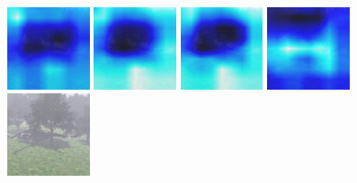 \begin{figure}[H]
  {\includegraphics[height=2.4cm, width=2.4cm]{images/vbs3/gradcam/5-5/2/Heat_map_of_iterations_0.png}}
  {\includegraphics[height=2.4cm, width=2.4cm]{images/vbs3/gradcam/5-5/2/Heat_map_of_iterations_1.png}}
  {\includegraphics[height=2.4cm, width=2.4cm]{images/vbs3/gradcam/5-5/2/Heat_map_of_iterations_3.png}}
%
  {\includegraphics[height=2.4cm, width=2.4cm]{images/vbs3/gradcam/5-5/2/Heat_map_of_iterations_5.png}}
  {\includegraphics[height=2.4cm, width=2.4cm]{images/vbs3/gradcam/5-5/2/Test_Images.png}}
  

\end{figure}
